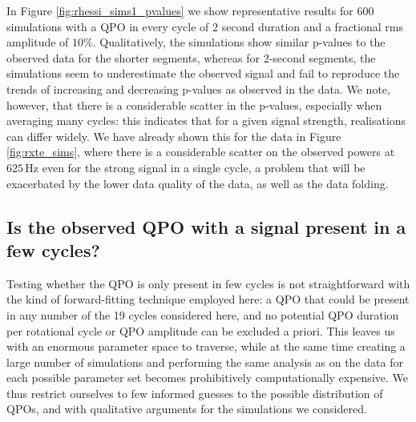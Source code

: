 \documentclass{emulateapj}
\begin{document}
In Figure \ref{fig:rhessi_sims1_pvalues} we show representative results for $600$ simulations with a QPO in every cycle of $2$ second duration and a fractional rms amplitude of $10\%$. Qualitatively, the simulations show similar p-values to the observed \rhessi data for the shorter segments, whereas for $2$-second segments, the simulations seem to underestimate the observed signal and fail to reproduce the trends of increasing and decreasing p-values as observed in the data. We note, however, that there is a considerable scatter in the p-values, especially when averaging many cycles: this indicates that for a given signal strength, realisations can differ widely. We have already shown this for the \rxte data in Figure \ref{fig:rxte_sims}, where there is a considerable scatter on the observed powers at $625 \, \mathrm{Hz}$ even for the strong signal in a single cycle, a problem that will be exacerbated by the lower data quality of the \rhessi data, as well as the data folding.



\subsection{Is the observed QPO with a signal present in a few cycles?}

Testing whether the QPO is only present in few cycles is not straightforward with the kind of forward-fitting technique employed here: a QPO that could be present in any number of the 19 cycles considered here, and no potential QPO duration per rotational cycle or QPO amplitude can be excluded a priori. This leaves us with an enormous parameter space to traverse, while at the same time creating a large number of simulations and performing the same analysis as on the data for each possible parameter set becomes prohibitively computationally expensive. We thus restrict ourselves to few informed guesses to the possible distribution of QPOs, and with qualitative arguments for the simulations we considered. 
\end{document}
